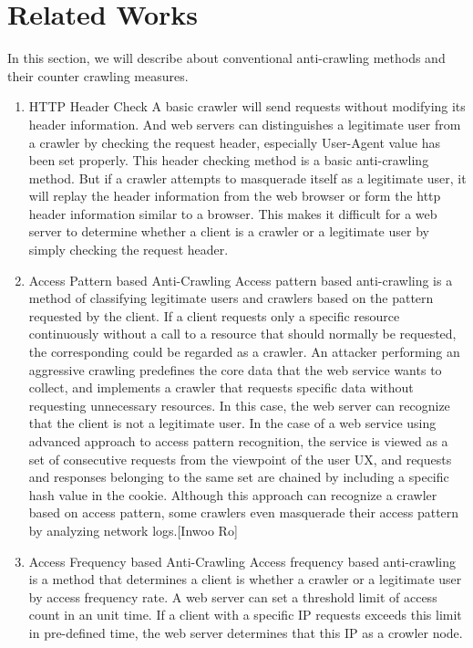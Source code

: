\documentclass[sigconf,anonymous=false]{acmart}
\begin{document}
\section{Related Works}
In this section, we will describe about conventional anti-crawling methods and their counter crawling measures.
\begin{enumerate}
\item HTTP Header Check
\newline A basic crawler will send requests without modifying its header information. And web servers can distinguishes a legitimate user from a crawler by checking the request header, especially User-Agent value has been set properly. This header checking method is a basic anti-crawling method.
But if a crawler attempts to masquerade itself as a legitimate user, it will replay the header information from the web browser or form the http header information similar to a browser. This makes it difficult for a web server to determine whether a client is a crawler or a legitimate user by simply checking the request header.
\newline

\item Access Pattern based Anti-Crawling
\newline
Access pattern based anti-crawling is a method of classifying legitimate users and crawlers based on the pattern requested by the client. If a client requests only a specific resource continuously without a call to a resource that should normally be requested, the corresponding could be regarded as a crawler. 
An attacker performing an aggressive crawling predefines the core data that the web service wants to collect, and implements a crawler that requests specific data without requesting unnecessary resources. In this case, the web server can recognize that the client is not a legitimate user.
In the case of a web service using advanced approach to access pattern recognition, the service is viewed as a set of consecutive requests from the viewpoint of the user UX, and requests and responses belonging to the same set are chained by including a specific hash value in the cookie.
Although this approach can recognize a crawler based on access pattern, some crawlers even masquerade their access pattern by analyzing network logs.[Inwoo Ro] 
\newline 
\item Access Frequency based Anti-Crawling
\newline 
Access frequency based anti-crawling is a method that determines a client is whether a crawler or a legitimate user by access frequency rate. A web server can set a threshold limit of access count in an unit time. If a client with a specific IP requests exceeds this limit in pre-defined time, the web server determines that this IP as a crowler node.


\end{enumerate}
\end{document}
